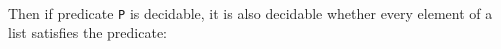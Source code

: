 \begin{fence}
\begin{code}%
\>[0]\AgdaSpace{}%
\AgdaSymbol{:}\AgdaSpace{}%
\AgdaSpace{}%
\AgdaSymbol{\{}\AgdaSpace{}%
\AgdaSymbol{:}\AgdaSpace{}%
\AgdaSymbol{\}}\AgdaSpace{}%
\AgdaSpace{}%
\AgdaSymbol{(}\AgdaSpace{}%
\AgdaSpace{}%
\AgdaSymbol{)}\AgdaSpace{}%
\AgdaSpace{}%
\<%
\\
\>[0]\AgdaSpace{}%
\AgdaSymbol{\{}\AgdaSymbol{\}}\AgdaSpace{}%
%
\>[17]\AgdaSymbol{=}%
\>[20]\AgdaSpace{}%
\AgdaSymbol{(}\AgdaSpace{}%
\AgdaSymbol{:}\AgdaSpace{}%
\AgdaSymbol{)}\AgdaSpace{}%
\AgdaSpace{}%
\AgdaSpace{}%
\AgdaSymbol{(}\AgdaSpace{}%
\AgdaSymbol{)}\<%
\end{code}
\end{fence}

Then if predicate \texttt{P} is decidable, it is also decidable whether
every element of a list satisfies the predicate:

